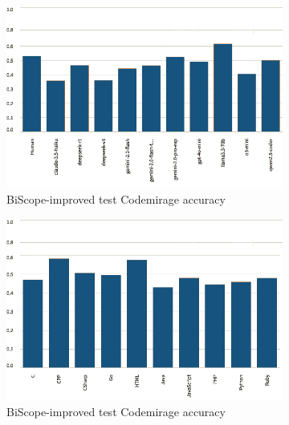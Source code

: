 \begin{figure}[H]
    \centering
    \begin{subfigure}[t]{0.35\textwidth}
        \centering
        \includegraphics[width=\linewidth]{img/TEST/BiScope/visualization(35).png}
        \caption{BiScope-improved test Codemirage accuracy}
        \label{fig:1}
    \end{subfigure}
    \hfill
    \begin{subfigure}[t]{0.35\textwidth}
        \centering
        \includegraphics[width=\linewidth]{img/TEST/BiScope/visualization(34).png}
        \caption{BiScope-improved test Codemirage accuracy}
        \label{fig:b1}
    \end{subfigure}
    \hfill
    \begin{subfigure}[b]{0.4\textwidth}
        \centering

\end{subfigure}
\end{figure}

